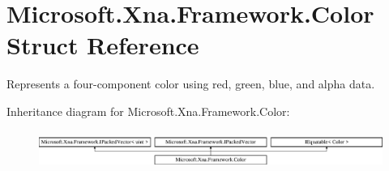 \hypertarget{struct_microsoft_1_1_xna_1_1_framework_1_1_color}{}\section{Microsoft.\+Xna.\+Framework.\+Color Struct Reference}
\label{struct_microsoft_1_1_xna_1_1_framework_1_1_color}


Represents a four-\/component color using red, green, blue, and alpha data. 


Inheritance diagram for Microsoft.\+Xna.\+Framework.\+Color\+:\begin{figure}[H]
\begin{center}
\leavevmode
\includegraphics[height=1.252796cm]{struct_microsoft_1_1_xna_1_1_framework_1_1_color}
\end{center}
\end{figure}

